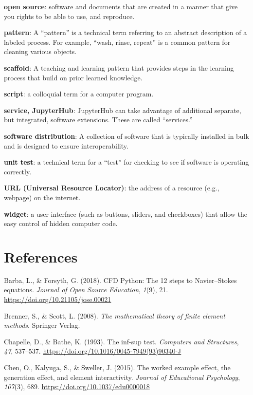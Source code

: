 \documentclass[]{book}
\begin{document}
\textbf{open source}: software and documents that are created in a
manner that give you rights to be able to use, and reproduce.

\textbf{pattern}: A ``pattern'' is a technical term referring to an
abstract description of a labeled process. For example, ``wash, rinse,
repeat'' is a common pattern for cleaning various objects.

\textbf{scaffold}: A teaching and learning pattern that provides steps
in the learning process that build on prior learned knowledge.

\textbf{script}: a colloquial term for a computer program.

\textbf{service, JupyterHub}: JupyterHub can take advantage of
additional separate, but integrated, software extensions. These are
called ``services.''

\textbf{software distribution}: A collection of software that is
typically installed in bulk and is designed to ensure interoperability.

\textbf{unit test}: a technical term for a ``test'' for checking to see
if software is operating correctly.

\textbf{URL (Universal Resource Locator)}: the address of a resource
(e.g., webpage) on the internet.

\textbf{widget}: a user interface (such as buttons, sliders, and
checkboxes) that allow the easy control of hidden computer code.

\chapter*{References}\label{references}

\hypertarget{refs}{}
\hypertarget{ref-barbacfd}{}
Barba, L., \& Forsyth, G. (2018). CFD Python: The 12 steps to
Navier--Stokes equations. \emph{Journal of Open Source Education},
\emph{1}(9), 21. \url{https://doi.org/10.21105/jose.00021}

\hypertarget{ref-brenner2008mathematical}{}
Brenner, S., \& Scott, L. (2008). \emph{The mathematical theory of
finite element methods}. Springer Verlag.

\hypertarget{ref-chapelle1993inf}{}
Chapelle, D., \& Bathe, K. (1993). The inf-sup test. \emph{Computers and
Structures}, \emph{47}, 537--537.
\url{https://doi.org/10.1016/0045-7949(93)90340-J}

\hypertarget{ref-chen2015worked}{}
Chen, O., Kalyuga, S., \& Sweller, J. (2015). The worked example effect,
the generation effect, and element interactivity. \emph{Journal of
Educational Psychology}, \emph{107}(3), 689.
\url{https://doi.org/10.1037/edu0000018}
\end{document}
